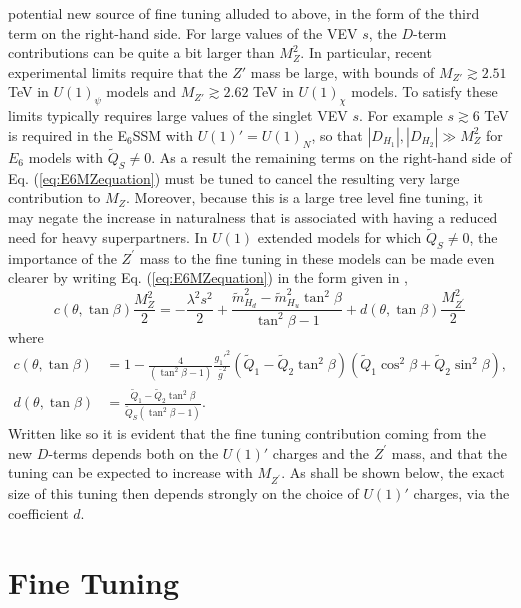 \documentclass[preprint,amsmath,amssymb,aps,superscriptaddress,prd,showpacs,floatfix,nofootinbib]{revtex4-1}
\begin{document}
potential new source of fine tuning alluded to above, in the form of
the third term on the right-hand side. For large values of the VEV
$s$, the $D$-term contributions can be quite a bit larger than
$M_Z^2$. In particular, recent experimental limits \cite{Aad:2014cka}
require that the $Z'$ mass be large, with bounds of $M_{Z'}\gtrsim
2.51$ TeV in $U(1)_\psi$ models and $M_{Z'}\gtrsim 2.62$ TeV in
$U(1)_\chi$ models. To satisfy these limits typically requires large
values of the singlet VEV $s$. For example $s\gtrsim 6$ TeV is
required in the E$_6$SSM with $U(1)'=U(1)_N$, so that
$|D_{H_1}|,|D_{H_2}|\gg M_Z^2$ for $E_6$ models with $\tilde{Q}_S\neq
0$. As a result the remaining terms on the right-hand side of
Eq. (\ref{eq:E6MZequation}) must be tuned to cancel the resulting very
large contribution to $M_Z$. Moreover, because this is a large tree
level fine tuning, it may negate the increase in naturalness that is
associated with having a reduced need for heavy superpartners. In
$U(1)$ extended models for which $\tilde{Q}_S\neq 0$, the importance
of the $Z^\prime$ mass to the fine tuning in these models can be made
even clearer by writing Eq. (\ref{eq:E6MZequation}) in the form given
in \cite{Athron:2013ipa},
\begin{equation}\label{eq:originalE6MZequation}
c(\theta,\tan\beta)\frac{M_Z^2}{2}=-\frac{\lambda^2 s^2}{2}+\frac{\tilde{m}_{H_d}^2-\tilde{m}_{H_u}^2\tan^2\beta}{\tan^2\beta-1}+d(\theta,\tan\beta)\frac{M_{Z^\prime}^2}{2}
\end{equation}
where 
\begin{align}
c(\theta,\tan\beta)&=1-\frac{4}{\left ( \tan^2\beta-1\right )}\frac{g_1'^2}{\bar{g}^2}\left ( \tilde{Q}_1-\tilde{Q}_2\tan^2\beta \right )\left ( \tilde{Q}_1\cos^2\beta+\tilde{Q}_2\sin^2\beta \right ),\label{eq:cdefn}\\
d(\theta,\tan\beta)&= \frac{\tilde{Q}_1-\tilde{Q}_2\tan^2\beta}{\tilde{Q}_S\left ( \tan^2\beta - 1\right )}.\label{eq:ddefn}
\end{align}
Written like so it is evident that the fine tuning contribution coming
from the new $D$-terms depends both on the $U(1)'$ charges and the
$Z^\prime$ mass, and that the tuning can be expected to increase with
$M_{Z^\prime}$. As shall be shown below, the exact size of this tuning
then depends strongly on the choice of $U(1)'$ charges, via the
coefficient $d$.
\section{\label{sec:tuning}Fine Tuning}
\end{document}
